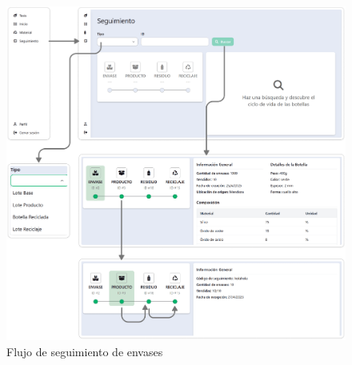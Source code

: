 \begin{figure}[!htb]
	\centering
	\includegraphics[width=\linewidth]{Figures/flow-tracking.png}
	\caption{Flujo de seguimiento de envases}
  \label{fig:flow-tracking}
\end{figure}
